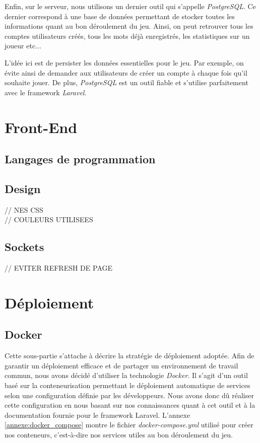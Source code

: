 \documentclass{tnreport}
\begin{document}
Enfin, sur le serveur, nous utilisons un dernier outil qui s'appelle \textit{PostgreSQL}. Ce dernier correspond à une base de données permettant de stocker toutes les informations quant au bon déroulement du jeu. Ainsi, on peut retrouver tous les comptes utilisateurs créés, tous les mots déjà enregistrés, les statistiques sur un joueur etc... 

L'idée ici est de persister les données essentielles pour le jeu. Par exemple, on évite ainsi de demander aux utilisateurs de créer un compte à chaque fois qu'il souhaite jouer. De plus, \textit{PostgreSQL} est un outil fiable et s'utilise parfaitement avec le framework \textit{Laravel}. 

\section{Front-End}

\subsection{Langages de programmation}

\subsection{Design}

// NES CSS \\
// COULEURS UTILISEES

\subsection{Sockets}

// EVITER REFRESH DE PAGE

\section{Déploiement}

\subsection{Docker}

Cette sous-partie s'attache à décrire la stratégie de déploiement adoptée. Afin de garantir un déploiement efficace et de partager un environnement de travail commun, nous avons décidé d'utiliser la technologie \textit{Docker}. Il s'agit d'un outil basé sur la conteneurisation permettant le déploiement automatique de services selon une configuration définie par les développeurs. Nous avons donc dû réaliser cette configuration en nous basant sur nos connaissances quant à cet outil et à la documentation fournie pour le framework Laravel. L'annexe \ref{annexe:docker_compose} montre le fichier \textit{docker-compose.yml} utilisé pour créer nos conteneurs, c'est-à-dire nos services utiles au bon déroulement du jeu.
\end{document}
